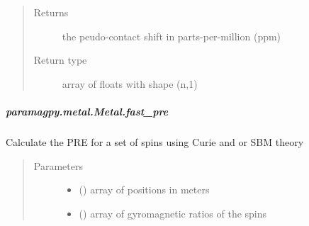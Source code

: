 \documentclass[a4paper,10pt,english,openany,oneside]{sphinxmanual}
\begin{document}
\begin{fulllineitems}
\begin{fulllineitems}
\begin{fulllineitems}
\begin{quote}
\begin{description}
\item[{Returns}] \leavevmode
{} \textendash{} the peudo-contact shift in parts-per-million (ppm)

\item[{Return type}] \leavevmode
array of floats with shape (n,1)

\end{description}\end{quote}

\end{fulllineitems}



\subparagraph{paramagpy.metal.Metal.fast\_pre}
\label{\detokenize{reference/generated/paramagpy.metal.Metal.fast_pre:paramagpy-metal-metal-fast-pre}}\label{\detokenize{reference/generated/paramagpy.metal.Metal.fast_pre::doc}}

\begin{fulllineitems}
\label{\detokenize{reference/generated/paramagpy.metal.Metal.fast_pre:paramagpy.metal.Metal.fast_pre}}
Calculate the PRE for a set of spins using Curie and or SBM theory
\begin{quote}\begin{description}
\item[{Parameters}] \leavevmode\begin{itemize}
\item {} 
 (\sphinxstyleliteralemphasis{\sphinxupquote{ (}}\sphinxstyleliteralemphasis{\sphinxupquote{,}}\sphinxstyleliteralemphasis{\sphinxupquote{)}}) \textendash{} array of positions in meters

\item {} 
 (\sphinxstyleliteralemphasis{\sphinxupquote{ (}}\sphinxstyleliteralemphasis{\sphinxupquote{,}}\sphinxstyleliteralemphasis{\sphinxupquote{)}}) \textendash{} array of gyromagnetic ratios of the spins


\end{itemize}
\end{description}
\end{quote}
\end{fulllineitems}
\end{fulllineitems}
\end{fulllineitems}
\end{document}
